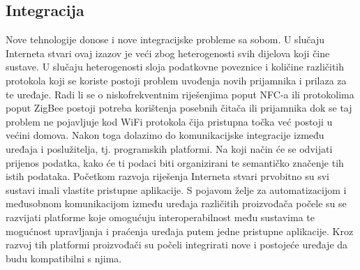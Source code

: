 \documentclass[times, utf8, diplomski]{fer}
\begin{document}
\subsection{Integracija}
Nove tehnologije donose i nove integracijske probleme sa sobom. U slučaju Interneta stvari ovaj izazov je veći zbog heterogenosti svih dijelova koji čine sustave. U slučaju heterogenosti sloja podatkovne poveznice i količine različitih protokola koji se koriste postoji problem uvođenja novih prijamnika i prilaza za te uređaje. Radi li se o niskofrekventnim riješenjima poput NFC-a ili protokolima poput ZigBee postoji potreba korištenja posebnih čitača ili prijamnika dok se taj problem ne pojavljuje kod WiFi protokola čija pristupna točka već postoji u većini domova. Nakon toga dolazimo do komunikacijske integracije između uređaja i poslužitelja, tj. programskih platformi. Na koji način će se odvijati prijenos podatka, kako će ti podaci biti organizirani te semantičko značenje tih istih podataka. Početkom razvoja riješenja Interneta stvari prvobitno su svi sustavi imali vlastite pristupne aplikacije. S pojavom želje za automatizacijom i međusobnom komunikacijom između uređaja različitih proizvođača počele su se razvijati platforme koje omogućuju interoperabilnost među sustavima te mogućnost upravljanja i praćenja uređaja putem jedne pristupne aplikacije. Kroz razvoj tih platformi proizvođači su počeli integrirati nove i postojeće uređaje da budu kompatibilni s njima.
\end{document}
